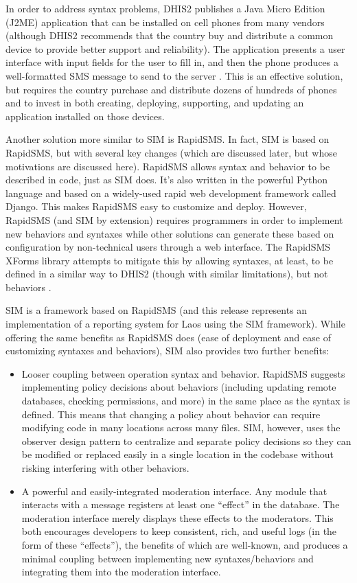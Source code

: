 \documentclass{acm_proc_article-sp}
\begin{document}
In order to address syntax problems, DHIS2 publishes a Java Micro Edition (J2ME) application that can be installed on cell phones from many vendors (although DHIS2 recommends that the country buy and distribute a common device to provide better support and reliability). The application presents a user interface with input fields for the user to fill in, and then the phone produces a well-formatted SMS message to send to the server \cite{dhis2:smsoverview, dhis2:j2me}. This is an effective solution, but requires the country purchase and distribute dozens of hundreds of phones and to invest in both creating, deploying, supporting, and updating an application installed on those devices.

Another solution more similar to SIM is RapidSMS. In fact, SIM is based on RapidSMS, but with several key changes (which are discussed later, but whose motivations are discussed here). RapidSMS allows syntax and behavior to be described in code, just as SIM does. It's also written in the powerful Python language and based on a widely-used rapid web development framework called Django. This makes RapidSMS easy to customize and deploy. However, RapidSMS (and SIM by extension) requires programmers in order to implement new behaviors and syntaxes while other solutions can generate these based on configuration by non-technical users through a web interface. The RapidSMS XForms library attempts to mitigate this by allowing syntaxes, at least, to be defined in a similar way to DHIS2 (though with similar limitations), but not behaviors \cite{rapidsms:overview, rapidsms:xforms}.

SIM is a framework based on RapidSMS (and this release represents an implementation of a reporting system for Laos using the SIM framework). While offering the same benefits as RapidSMS does (ease of deployment and ease of customizing syntaxes and behaviors), SIM also provides two further benefits: 

\begin{itemize}
\item Looser coupling between operation syntax and behavior. RapidSMS suggests implementing policy decisions about behaviors (including updating remote databases, checking permissions, and more) in the same place as the syntax is defined. This means that changing a policy about behavior can require modifying code in many locations across many files. SIM, however, uses the observer design pattern to centralize and separate policy decisions so they can be modified or replaced easily in a single location in the codebase without risking interfering with other behaviors.
\item A powerful and easily-integrated moderation interface. Any module that interacts with a message registers at least one ``effect'' in the database. The moderation interface merely displays these effects to the moderators. This both encourages developers to keep consistent, rich, and useful logs (in the form of these ``effects''), the benefits of which are well-known, and produces a minimal coupling between implementing new syntaxes/behaviors and integrating them into the moderation interface.
\end{itemize}
\end{document}
